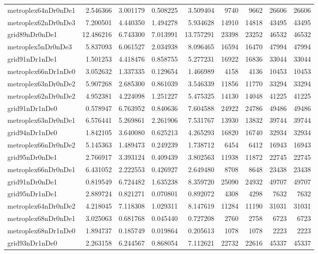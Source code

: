\begin{longtable}{|l|r|r|r|r|r|r|r|r|}
metroplex64nDr0nDe1 & 2.546366 & 3.001179 & 0.508225 & 3.509404 & 9740 & 9662 & 26606 & 26606 \\
metroplex62nDr0nDe3 & 7.200501 & 4.440350 & 1.494278 & 5.934628 & 14910 & 14818 & 43495 & 43495 \\
grid89nDr0nDe1 & 12.486216 & 6.743300 & 7.013991 & 13.757291 & 23398 & 23252 & 46532 & 46532 \\
metroplex5nDr0nDe3 & 5.837093 & 6.061527 & 2.034938 & 8.096465 & 16594 & 16470 & 47994 & 47994 \\
grid91nDr1nDe1 & 1.501253 & 4.418476 & 0.858755 & 5.277231 & 16922 & 16836 & 33044 & 33044 \\
metroplex66nDr1nDe0 & 3.052632 & 1.337335 & 0.129654 & 1.466989 & 4158 & 4136 & 10453 & 10453 \\
metroplex63nDr0nDe2 & 5.907268 & 2.685300 & 0.861039 & 3.546339 & 11856 & 11770 & 33294 & 33294 \\
metroplex62nDr0nDe2 & 4.952381 & 4.224098 & 1.251227 & 5.475325 & 14130 & 14048 & 41225 & 41225 \\
grid91nDr1nDe0 & 0.578947 & 6.763952 & 0.840636 & 7.604588 & 24922 & 24786 & 49486 & 49486 \\
metroplex63nDr0nDe1 & 6.576441 & 5.269861 & 2.261906 & 7.531767 & 13930 & 13832 & 39744 & 39744 \\
grid94nDr1nDe0 & 1.842105 & 3.640080 & 0.625213 & 4.265293 & 16820 & 16740 & 32934 & 32934 \\
metroplex66nDr0nDe2 & 5.145363 & 1.489473 & 0.249239 & 1.738712 & 6454 & 6412 & 16943 & 16943 \\
grid95nDr0nDe1 & 2.766917 & 3.393124 & 0.409439 & 3.802563 & 11938 & 11872 & 22745 & 22745 \\
metroplex66nDr0nDe1 & 6.431052 & 2.222553 & 0.426927 & 2.649480 & 8708 & 8648 & 23438 & 23438 \\
grid91nDr0nDe1 & 0.819549 & 6.724482 & 1.635238 & 8.359720 & 25090 & 24932 & 49707 & 49707 \\
grid95nDr1nDe1 & 2.889724 & 0.821271 & 0.070801 & 0.892072 & 4308 & 4298 & 7632 & 7632 \\
metroplex64nDr0nDe2 & 4.218045 & 7.118308 & 1.029311 & 8.147619 & 11284 & 11190 & 31031 & 31031 \\
metroplex68nDr0nDe1 & 3.025063 & 0.681768 & 0.045440 & 0.727208 & 2760 & 2758 & 6723 & 6723 \\
metroplex68nDr1nDe0 & 1.894737 & 0.185749 & 0.019864 & 0.205613 & 1078 & 1078 & 2223 & 2223 \\
grid93nDr1nDe0 & 2.263158 & 6.244567 & 0.868054 & 7.112621 & 22732 & 22616 & 45337 & 45337 \\

\end{longtable}
